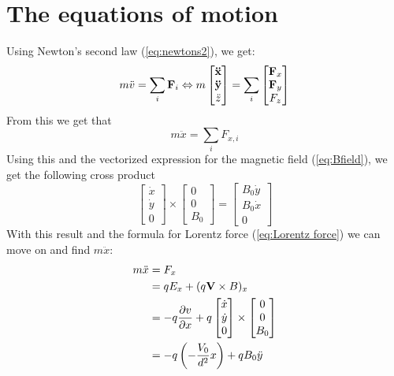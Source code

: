 \documentclass[english,notitlepage,reprint,nofootinbib]{revtex4-1}  %
\begin{document}
	\section{The equations of motion} \label{eq_motion}
	Using Newton’s second law (\ref{eq:newtons2}), we get:
	\begin{equation*}
		m \ddot{v} = \sum_i \vectorbold{F}_i \Leftrightarrow m
		\begin{bmatrix}
			\vectorbold{\ddot{x}} \\
			\vectorbold{\ddot{y}} \\
			\ddot{z}
		\end{bmatrix}
		= \sum_i
		\begin{bmatrix}
			\vectorbold{F}_x \\
			\vectorbold{F}_y \\
			F_z
		\end{bmatrix}
	\end{equation*}
	From this we get that 
	\begin{equation*}
		m \ddot{x} = \sum_i F_{x,i}
	\end{equation*}
	Using this and the vectorized expression for the magnetic field (\ref{eq:Bfield}), we get the following cross product
	\begin{equation*}
		\begin{bmatrix}
			\dot{x} \\
			\dot{y} \\
			0
		\end{bmatrix}
		\times
		\begin{bmatrix}
			0\\
			0 \\
			B_0
		\end{bmatrix}
		=
		\begin{bmatrix}
			B_0 \dot{y} \\
			B_0 \dot{x} \\
			0
		\end{bmatrix}
	\end{equation*}
	With this result and the formula for Lorentz force (\ref{eq:Lorentz force}) we can move on and find $m \ddot{x}$:
	\begin{align*}
		m \ddot{x} &= F_x \\
		&= q E_x + (q \vectorbold{V} \times B)_x \\
		&= -q \frac{\partial v}{\partial x} + q
		\begin{bmatrix}
			\dot{x} \\
			\dot{y} \\
			0
		\end{bmatrix}
		\times
		\begin{bmatrix}
			0 \\
			0 \\
			B_0
		\end{bmatrix} \\
		&= - q \left( - \frac{V_0}{d^2} x \right) + q B_0 \ddot{y} \\
	\end{align*}
\end{document}
